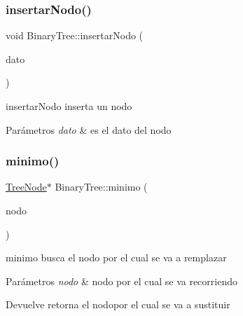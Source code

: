 \subsubsection{\texorpdfstring{insertar\+Nodo()}{insertarNodo()}}
{\footnotesize\ttfamily void Binary\+Tree\+::insertar\+Nodo (\begin{DoxyParamCaption}\item[{int}]{dato }\end{DoxyParamCaption})\hspace{0.3cm}{\ttfamily [inline]}}



insertar\+Nodo inserta un nodo 


\begin{DoxyParams}{Parámetros}
{\em dato} & es el dato del nodo \\
\hline
\end{DoxyParams}
\mbox{\label{class_binary_tree_abcee209ca30b59708c0ef9f22863944c}} 
\subsubsection{\texorpdfstring{minimo()}{minimo()}}
{\footnotesize\ttfamily \mbox{\hyperlink{class_tree_node}{Tree\+Node}}$\ast$ Binary\+Tree\+::minimo (\begin{DoxyParamCaption}\item[{\mbox{\hyperlink{class_tree_node}{Tree\+Node}} $\ast$}]{nodo }\end{DoxyParamCaption})\hspace{0.3cm}{\ttfamily [inline]}}



minimo busca el nodo por el cual se va a remplazar 


\begin{DoxyParams}{Parámetros}
{\em nodo} & nodo por el cual se va recorriendo \\
\hline
\end{DoxyParams}
\begin{DoxyReturn}{Devuelve}
retorna el nodopor el cual se va a sustituir 
\end{DoxyReturn}
\mbox{\label{class_binary_tree_ad7162208805ed8f96c59cc6ba47d25a1}} 
